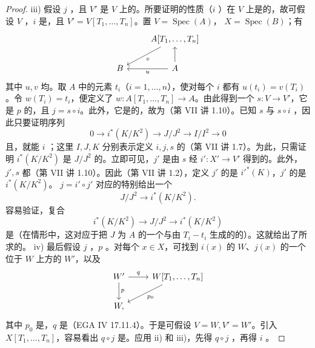 \begin{proof}
iii) 假设 $j$ ，且 $V'$ 是 $V$ 上的。所要证明的性质（$i$ ）在 $V$ 上是的，故可假设 $V$ ，$i$ 是，且 $V'=V[T_1,\ldots,T_n]$。置 $V=\operatorname{Spec}(A)$，
$X=\operatorname{Spec}(B)$；有
\[
\begin{tikzcd}&A[T_1,\ldots,T_n]\arrow[dl,"v"]\\B&A\arrow[l,"u"]\arrow[u]\end{tikzcd}
\]
其中 $u,v$ 均。取 $A$ 中的元素 $t_i$（$i=1,\ldots,n$），使对每个 $i$ 都有 $u(t_i)=v(T_i)$。令 $w(T_i)=t_i$，便定义了 $w:A[T_1,\ldots,T_n]\to A$。由此得到一个 $s:V\to V'$，它是 $p$ 的，且 $j=s\circ i$。此外，它是的，故为（第 VII 讲 1.10）。已知 $s$ 与 $s\circ i$ ，因此只要证明序列
\[
0\longrightarrow i^*(K/K^2)\longrightarrow J/J^2\longrightarrow I/I^2\longrightarrow0
\]
且，就能 $i$ ；这里 $I,J,K$ 分别表示定义 $i,j,s$ 的（第 VII 讲 1.7）。为此，只需证明 $i^*(K/K^2)$ 是 $J/J^2$ 的。立即可见，$j'$ 是由 $s$ 经 $i':X'\to V'$ 得到的。此外， $j',s$ 都（第 VII 讲 1.10）。因此（第 VII 讲 1.2），定义 $j'$ 的是 $i'^*(K)$，$j'$ 的是 $i^*(K/K^2)$。 $j=i'\circ j'$ 对应的特别给出一个
\[J/J^2\longrightarrow i^*(K/K^2).\]
容易验证，复合
\[i^*(K/K^2)\longrightarrow J/J^2\longrightarrow i^*(K/K^2)\]
是（在情形中，这对应于把 $J$ 为 $A$ 的一个与由 $T_i-t_i$ 生成的的）。这就给出了所求的。
iv) 最后假设 $j$ ，$p$ 。对每个 $x\in X$，可找到 $i(x)$ 的 $W$、$j(x)$ 的一个位于 $W$ 上方的 $W'$，以及
\[
\begin{tikzcd}W'\arrow[r,"q"]\arrow[d,"p"]&W[T_1,\ldots,T_n]\arrow[dl,"p_0"]\\W,\end{tikzcd}
\]
其中 $p_0$ 是，$q$ 是（EGA IV 17.11.4）。于是可假设 $V=W,V'=W'$。引入 $X[T_1,\ldots,T_n]$，容易看出 $q\circ j$ 是。应用 ii) 和 iii)，先得 $q\circ j$ ，再得 $i$ 。
\end{proof}
